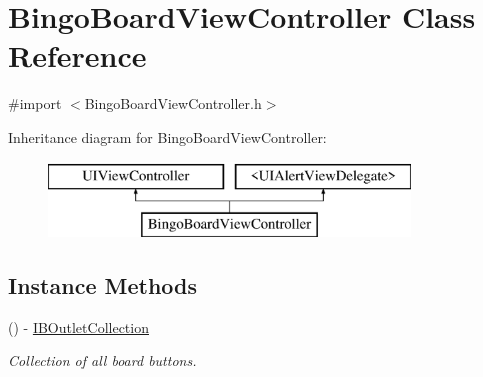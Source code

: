 \hypertarget{interface_bingo_board_view_controller}{\section{Bingo\+Board\+View\+Controller Class Reference}
\label{interface_bingo_board_view_controller}
}


{\ttfamily \#import $<$Bingo\+Board\+View\+Controller.\+h$>$}

Inheritance diagram for Bingo\+Board\+View\+Controller\+:\begin{figure}[H]
\begin{center}
\leavevmode
\includegraphics[height=2.000000cm]{interface_bingo_board_view_controller}
\end{center}
\end{figure}
\subsection*{Instance Methods}
\begin{DoxyCompactItemize}
\item 
\hypertarget{interface_bingo_board_view_controller_aa04e778e49c26348c59bfacc624bdd4e}{() -\/ \hyperlink{interface_bingo_board_view_controller_aa04e778e49c26348c59bfacc624bdd4e}{I\+B\+Outlet\+Collection}}\label{interface_bingo_board_view_controller_aa04e778e49c26348c59bfacc624bdd4e}

\begin{DoxyCompactList}\small\item\em Collection of all board buttons. \end{DoxyCompactList}\end{DoxyCompactItemize}
